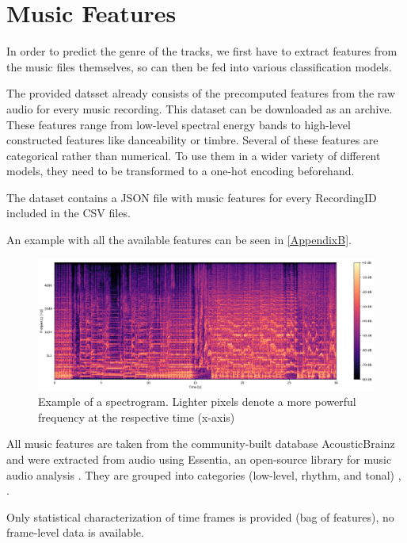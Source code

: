 \section{Music Features}

In order to predict the genre of the tracks, we first have to extract
features from the music files themselves, so can then be fed into various
classification models.

The provided datsset already consists of the precomputed features from the raw audio for every music recording. 
This dataset can be downloaded as an archive.
These features range from low-level spectral energy bands to high-level
constructed features like danceability or timbre.
Several of these features are categorical rather than numerical. 
To use them in a wider variety
of different models, they need to be transformed to a one-hot encoding beforehand. 

The dataset contains a JSON\cite{json} file with music features for every RecordingID included in the CSV files. 

An example with all the available features can be seen in \ref{AppendixB}.

\begin{figure}[!htb]
    \centering
    \includegraphics[width=1.0\textwidth]{Figures/freq.png}
    \decoRule
    \caption[Spectogram Example]{Example of a spectrogram. Lighter pixels denote a more powerful frequency at the respective time (x-axis)}
    \label{fig:spectrogram}
\end{figure}


All music features are taken from the community-built database AcousticBrainz and were extracted from audio using Essentia, an open-source library for music audio analysis \cite{essentia}. 
They are grouped into categories (low-level, rhythm, and tonal) \cite{essentiafeatures}, \cite{Bogdanov2013}. 

Only statistical characterization of time frames is provided (bag of features), no frame-level data is available.

